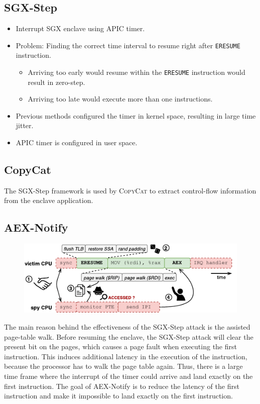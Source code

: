 \documentclass{llncs}
\begin{document}
\subsection{SGX-Step}
\begin{itemize}
  \item Interrupt SGX enclave using APIC timer.
  \item Problem: Finding the correct time interval to resume right after
    \texttt{ERESUME} instruction.
    \begin{itemize}
      \item Arriving too early would resume within the \texttt{ERESUME}
        instruction would result in zero-step.
      \item Arriving too late would execute more than one instructions.
    \end{itemize}
  \item Previous methods configured the timer in kernel space, resulting in
    large time jitter.
  \item APIC timer is configured in user space.
\end{itemize}

\subsection{CopyCat}

The SGX-Step framework is used by \textsc{CopyCat} to extract control-flow
information from the enclave application.

\subsection{AEX-Notify}

\begin{figure}[t]
  \centering
  \includegraphics{images/sgx-step-pte.pdf}
  \caption{}
  \label{fig:sgx-step-pte}
\end{figure}

The main reason behind the effectiveness of the SGX-Step attack is the assisted
page-table walk.
Before resuming the enclave, the SGX-Step attack will clear the present bit
on the pages, which causes a page fault when executing the first instruction.
This induces additional latency in the execution of the instruction, because
the processor has to walk the page table again.
Thus, there is a large time frame where the interrupt of the timer could
arrive and land exactly on the first instruction.
The goal of AEX-Notify \cite{ConstableBCXXAK23} is to reduce the latency of the
first instruction and make it impossible to land exactly on the first
instruction.
\end{document}
